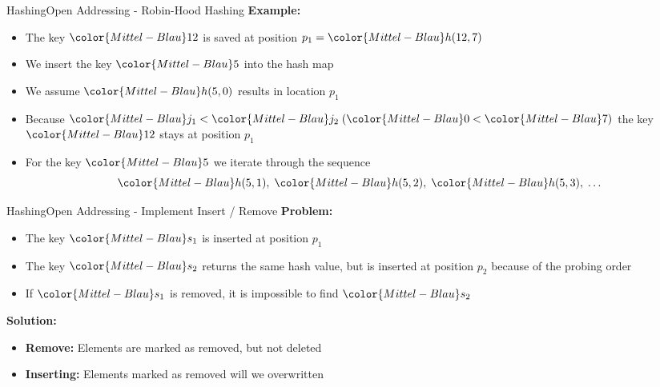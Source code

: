 
\begin{frame}{Hashing}{Open Addressing - Robin-Hood Hashing}
  \textbf{Example:}
  \begin{itemize}
    \item
      The key ${\color{Mittel-Blau}12}$ is saved at position
      $p_1 = {\color{Mittel-Blau}h(12, 7)}$
    \item
      We insert the key ${\color{Mittel-Blau}5}$ into the hash map
    \item
      We assume ${\color{Mittel-Blau}h(5,0)}$ results in location $p_1$
    \item
      Because
      \begin{math}
        {\color{Mittel-Blau}j_1} < {\color{Mittel-Blau}j_2} \;
        ({\color{Mittel-Blau}0} < {\color{Mittel-Blau}7})
      \end{math}
      the key ${\color{Mittel-Blau}12}$ stays at position $p_1$
    \item
      For the key ${\color{Mittel-Blau}5}$ we iterate through the 
      sequence
      \begin{displaymath}
        {\color{Mittel-Blau}h(5, 1)} ,\;
        {\color{Mittel-Blau}h(5, 2)} ,\;
        {\color{Mittel-Blau}h(5, 3)} ,\;
        \dots
      \end{displaymath}
  \end{itemize}
\end{frame}


\begin{frame}{Hashing}{Open Addressing - Implement Insert / Remove}
  \textbf{Problem:}
  \begin{itemize}
    \item
      The key ${\color{Mittel-Blau}s_1}$ is inserted at position $p_1$
    \item
      The key ${\color{Mittel-Blau}s_2}$ returns the same hash value,
      but is inserted at position $p_2$ because of the probing order
    \item
      If ${\color{Mittel-Blau}s_1}$ is removed, it is impossible to find
      ${\color{Mittel-Blau}s_2}$
  \end{itemize}
  \vspace{1.0em}
  \textbf{Solution:}
  \begin{itemize}
    \item<3->
      \textbf{Remove:}
      Elements are marked as removed, but not deleted
    \item<4->
      \textbf{Inserting:}
      Elements marked as removed will we overwritten
  \end{itemize}
\end{frame}

